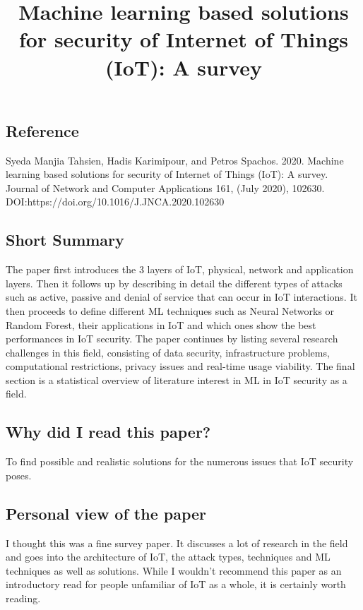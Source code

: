 \documentclass[11pt,a4paper]{article}
\title{Machine learning based solutions for security of Internet of Things (IoT): A survey}
\author{}
\date{}
\begin{document}
\maketitle

\subsection*{Reference}
Syeda Manjia Tahsien, Hadis Karimipour, and Petros Spachos. 2020. Machine learning based solutions for security of Internet of Things (IoT): A survey. Journal of Network and Computer Applications 161, (July 2020), 102630. DOI:https://doi.org/10.1016/J.JNCA.2020.102630 

\subsection*{Short Summary} 
The paper first introduces the 3 layers of IoT, physical, network and application layers. Then it follows up by describing in detail the different types of attacks such as active, passive and denial of service that can occur in IoT interactions. It then proceeds to define different ML techniques such as Neural Networks or Random Forest, their applications in IoT and which ones show the best performances in IoT security. The paper continues by listing several research challenges in this field, consisting of data security, infrastructure problems, computational restrictions, privacy issues and real-time usage viability. The final section is a statistical overview of literature interest in ML in IoT security as a field.

\subsection*{Why did I read this paper?}
To find possible and realistic solutions for the numerous issues that IoT security poses.

\subsection*{Personal view of the paper}
I thought this was a fine survey paper. It discusses a lot of research in the field and goes into the architecture of IoT, the attack types, techniques and ML techniques as well as solutions. While I wouldn’t recommend this paper as an introductory read for people unfamiliar of IoT as a whole, it is certainly worth reading. 
\end{document}
